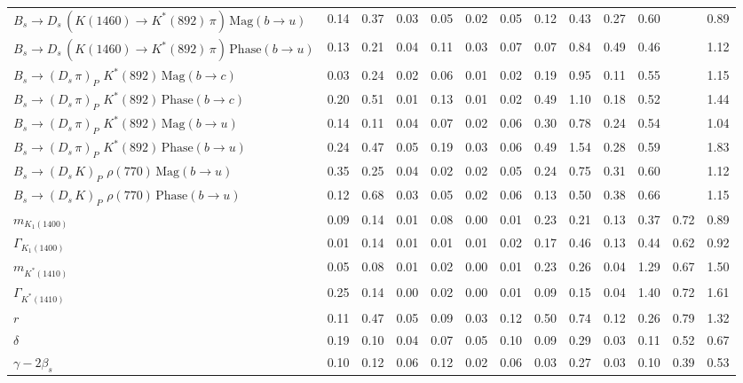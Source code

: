 \begin{tabular}{l  c  c  c  c  c  c  c  c  c  c  c  | c }
$B_s \to D_s \, ( K(1460) \to K^{*}(892) \, \pi ) \, \text{Mag} (b \to u)$ & 0.14 & 0.37 & 0.03 & 0.05 & 0.02 & 0.05 & 0.12 & 0.43 & 0.27 & 0.60 &  & 0.89 \\ 
$B_s \to D_s \, ( K(1460) \to K^{*}(892) \, \pi ) \, \text{Phase} (b \to u)$ & 0.13 & 0.21 & 0.04 & 0.11 & 0.03 & 0.07 & 0.07 & 0.84 & 0.49 & 0.46 &  & 1.12 \\ 
$B_s \to ( D_s \, \pi)_{P} \, \, K^{*}(892) \, \text{Mag} (b \to c)$ & 0.03 & 0.24 & 0.02 & 0.06 & 0.01 & 0.02 & 0.19 & 0.95 & 0.11 & 0.55 &  & 1.15 \\ 
$B_s \to ( D_s \, \pi)_{P} \, \, K^{*}(892) \, \text{Phase} (b \to c)$ & 0.20 & 0.51 & 0.01 & 0.13 & 0.01 & 0.02 & 0.49 & 1.10 & 0.18 & 0.52 &  & 1.44 \\ 
$B_s \to ( D_s \, \pi)_{P} \, \, K^{*}(892) \, \text{Mag} (b \to u)$ & 0.14 & 0.11 & 0.04 & 0.07 & 0.02 & 0.06 & 0.30 & 0.78 & 0.24 & 0.54 &  & 1.04 \\ 
$B_s \to ( D_s \, \pi)_{P} \, \, K^{*}(892) \, \text{Phase} (b \to u)$ & 0.24 & 0.47 & 0.05 & 0.19 & 0.03 & 0.06 & 0.49 & 1.54 & 0.28 & 0.59 &  & 1.83 \\ 
$B_s \to ( D_s \, K)_{P} \, \, \rho(770) \, \text{Mag} (b \to u)$ & 0.35 & 0.25 & 0.04 & 0.02 & 0.02 & 0.05 & 0.24 & 0.75 & 0.31 & 0.60 &  & 1.12 \\ 
$B_s \to ( D_s \, K)_{P} \, \, \rho(770) \, \text{Phase} (b \to u)$ & 0.12 & 0.68 & 0.03 & 0.05 & 0.02 & 0.06 & 0.13 & 0.50 & 0.38 & 0.66 &  & 1.15 \\ 
$m_{K_1(1400)} $ & 0.09 & 0.14 & 0.01 & 0.08 & 0.00 & 0.01 & 0.23 & 0.21 & 0.13 & 0.37 & 0.72 & 0.89 \\ 
$\Gamma_{K_1(1400)}$ & 0.01 & 0.14 & 0.01 & 0.01 & 0.01 & 0.02 & 0.17 & 0.46 & 0.13 & 0.44 & 0.62 & 0.92 \\ 
$m_{K^{*}(1410)}$ & 0.05 & 0.08 & 0.01 & 0.02 & 0.00 & 0.01 & 0.23 & 0.26 & 0.04 & 1.29 & 0.67 & 1.50 \\ 
$\Gamma_{K^{*}(1410)}$ & 0.25 & 0.14 & 0.00 & 0.02 & 0.00 & 0.01 & 0.09 & 0.15 & 0.04 & 1.40 & 0.72 & 1.61 \\ 
$r$ & 0.11 & 0.47 & 0.05 & 0.09 & 0.03 & 0.12 & 0.50 & 0.74 & 0.12 & 0.26 & 0.79 & 1.32 \\ 
$\delta$ & 0.19 & 0.10 & 0.04 & 0.07 & 0.05 & 0.10 & 0.09 & 0.29 & 0.03 & 0.11 & 0.52 & 0.67 \\ 
$\gamma - 2 \beta_{s}$ & 0.10 & 0.12 & 0.06 & 0.12 & 0.02 & 0.06 & 0.03 & 0.27 & 0.03 & 0.10 & 0.39 & 0.53 \\ 
\hline
\hline
\end{tabular}
